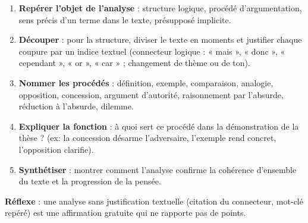 \documentclass[11pt]{article}
\begin{document}
\begin{methode}
\begin{enumerate}
\item \textbf{Repérer l'objet de l'analyse} : structure logique, procédé d'argumentation, sens précis d'un terme dans le texte, présupposé implicite.
\item \textbf{Découper} : pour la structure, diviser le texte en moments et justifier chaque coupure par un indice textuel (connecteur logique : « mais », « donc », « cependant », « or », « car » ; changement de thème ou de ton).
\item \textbf{Nommer les procédés} : définition, exemple, comparaison, analogie, opposition, concession, argument d'autorité, raisonnement par l'absurde, réduction à l'absurde, dilemme.
\item \textbf{Expliquer la fonction} : à quoi sert ce procédé dans la démonstration de la thèse ? (ex: la concession désarme l'adversaire, l'exemple rend concret, l'opposition clarifie).
\item \textbf{Synthétiser} : montrer comment l'analyse confirme la cohérence d'ensemble du texte et la progression de la pensée.
\end{enumerate}
\textbf{Réflexe} : une analyse sans justification textuelle (citation du connecteur, mot-clé repéré) est une affirmation gratuite qui ne rapporte pas de points.
\end{methode}
\end{document}
